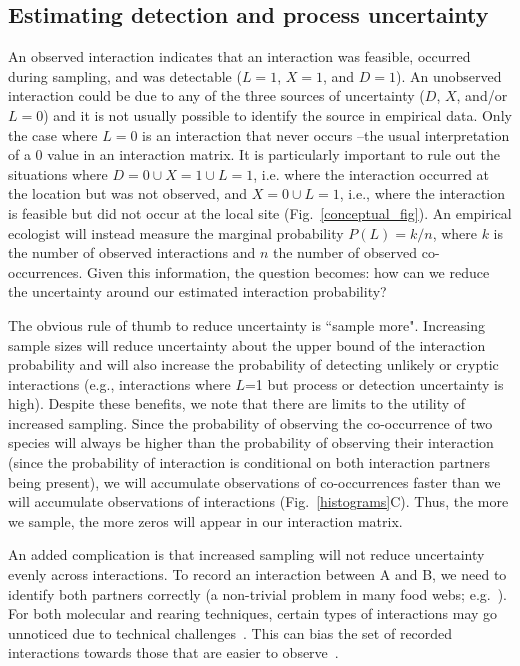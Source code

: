 \documentclass[12pt]{article}
\begin{document}
\begin{spacing}{2.0}
    \subsection*{Estimating detection and process uncertainty}

        An observed interaction indicates that an interaction was feasible, occurred during sampling, and was detectable ($L = 1$, $X = 1$, and $D = 1$). An unobserved interaction could be due to any of the three sources of uncertainty ($D$, $X$, and/or $L = 0$) and it is not usually possible to identify the source in empirical data. Only the case where $L = 0$ is an interaction that never occurs --the usual interpretation of a $0$ value in an interaction matrix. It is particularly important to rule out the situations where $D=0 \cup X = 1 \cup L=1$, i.e. where the interaction occurred at the location but was not observed, and $X = 0 \cup L =1$, i.e., where the interaction is feasible but did not occur at the local site (Fig.~\ref{conceptual_fig}). An empirical ecologist will instead measure the marginal probability $P(L) = k/n$, where $k$ is the number of observed interactions and $n$ the number of observed co-occurrences. Given this information, the question becomes: how can we reduce the uncertainty around our estimated interaction probability?


        The obvious rule of thumb to reduce uncertainty is ``sample more". Increasing sample sizes will reduce uncertainty about the upper bound of the interaction probability and will also increase the probability of detecting unlikely or cryptic interactions (e.g., interactions where $L$=1 but process or detection uncertainty is high). Despite these benefits, we note that there are limits to the utility of increased sampling. Since the probability of observing the co-occurrence of two species will always be higher than the probability of observing their interaction (since the probability of interaction is conditional on both interaction partners being present), we will accumulate observations of co-occurrences faster than we will accumulate observations of interactions (Fig.~\ref{histograms}C). Thus, the more we sample, the more zeros will appear in our interaction matrix.


        An added complication is that increased sampling will not reduce uncertainty evenly across interactions. To record an interaction between A and B, we need to identify both partners correctly (a non-trivial problem in many food webs; e.g.~\citealp{Kaartinen2011,Roslin2016}). For both molecular and rearing techniques, certain types of interactions may go unnoticed due to technical challenges~\citep{Wirta2014}. This can bias the set of recorded interactions towards those that are easier to observe~\citep{Carstensen2014,Jordano2016}.



\end{spacing}
\end{document}
